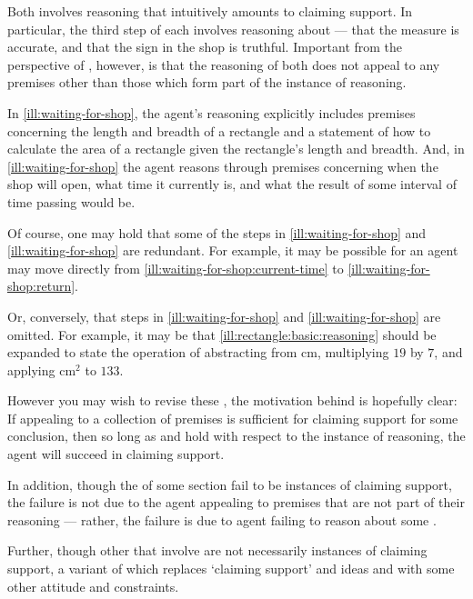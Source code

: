 \begin{note}
  Both  involves reasoning that intuitively amounts to claiming support.
  In particular, the third step of each  involves reasoning about  --- that the measure is accurate, and that the sign in the shop is truthful.
  Important from the perspective of \USE{}, however, is that the reasoning of both  does not appeal to any premises other than those which form part of the instance of reasoning.

  In \autoref{ill:waiting-for-shop}, the agent's reasoning explicitly includes premises concerning the length and breadth of a rectangle and a statement of how to calculate the area of a rectangle given the rectangle's length and breadth.
  And, in \autoref{ill:waiting-for-shop} the agent reasons through premises concerning when the shop will open, what time it currently is, and what the result of some interval of time passing would be.

  Of course, one may hold that some of the steps in \autoref{ill:waiting-for-shop} and \autoref{ill:waiting-for-shop} are redundant.
  For example, it may be possible for an agent may move directly from \ref{ill:waiting-for-shop:current-time} to \ref{ill:waiting-for-shop:return}.

  Or, conversely, that steps in \autoref{ill:waiting-for-shop} and \autoref{ill:waiting-for-shop} are omitted.
  For example, it may be that \ref{ill:rectangle:basic:reasoning} should be expanded to state the operation of abstracting from \(\text{cm}\), multiplying \(19\) by \(7\), and applying \(\text{cm}^{2}\) to \(133\).

  However you may wish to revise these , the motivation behind \USE{} is hopefully clear:
  If appealing to a collection of premises is sufficient for claiming support for some conclusion, then so long as \ideaS{} and \ideaCS{} hold with respect to the instance of reasoning, the agent will succeed in claiming support.
\end{note}

\begin{note}
  In addition, though the  of {\color{red} some section} fail to be instances of claiming support, the failure is not due to the agent appealing to premises that are not part of their reasoning --- rather, the failure is due to agent failing to reason about some \requ{}.
\end{note}

\begin{note}
  Further, though other  that involve are not necessarily instances of claiming support, a variant of \USE{} which replaces `claiming support' and ideas \ideaS{} and \ideaCS{} with some other attitude and constraints.
\end{note}

